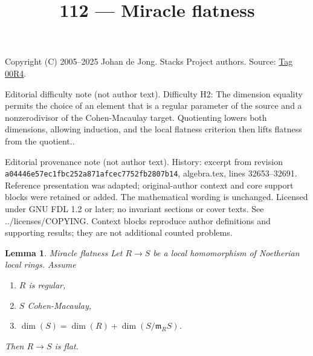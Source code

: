 \documentclass{amsart}
\newenvironment{slogan}{\comment}{\endcomment}
\theoremstyle{plain}
\newtheorem{lemma}[subsection]{Lemma}
\theoremstyle{definition}
\theoremstyle{remark}
\numberwithin{equation}{subsection}
\begin{document}
\title[Stacks Project, Tag 00R4]{112 --- Miracle flatness}
\maketitle
\noindent Copyright (C) 2005--2025 Johan de Jong. Stacks Project authors. Source: \href{https://stacks.math.columbia.edu/tag/00R4}{Tag 00R4}.

\noindent Editorial difficulty note (not author text). Difficulty H2: The dimension equality permits the choice of an element that is a regular parameter of the source and a nonzerodivisor of the Cohen-Macaulay target. Quotienting lowers both dimensions, allowing induction, and the local flatness criterion then lifts flatness from the quotient..

\noindent Editorial provenance note (not author text). History: excerpt from revision \texttt{a0444\allowbreak 6e57e\allowbreak c1fbc\allowbreak 252a8\allowbreak 71afc\allowbreak ec775\allowbreak 2fb28\allowbreak 07b14}, algebra.tex, lines 32653--32691. Reference presentation was adapted; original-author context and core support blocks were retained or added. The mathematical wording is unchanged. Licensed under GNU FDL 1.2 or later; no invariant sections or cover texts. See ../licenses/COPYING. Context blocks reproduce author definitions and supporting results; they are not additional counted problems.

\begin{lemma}
\label{lemma-CM-over-regular-flat}
\begin{slogan}
Miracle flatness
\end{slogan}
Let $R \to S$ be a local homomorphism of Noetherian local
rings. Assume
\begin{enumerate}
\item $R$ is regular,
\item $S$ Cohen-Macaulay,
\item $\dim(S) = \dim(R) + \dim(S/\mathfrak m_R S)$.
\end{enumerate}
Then $R \to S$ is flat.
\end{lemma}
\end{document}
